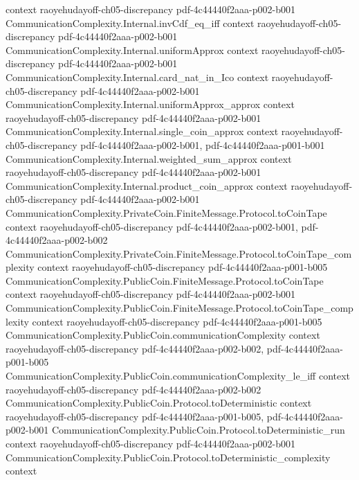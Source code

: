 \begin{theorem}
  {context}
  {raoyehudayoff-ch05-discrepancy}
  {pdf-4c44440f2aaa-p002-b001}
\proofstep
  {CommunicationComplexity.Internal.invCdf_eq_iff}
  {context}
  {raoyehudayoff-ch05-discrepancy}
  {pdf-4c44440f2aaa-p002-b001}
\proofstep
  {CommunicationComplexity.Internal.uniformApprox}
  {context}
  {raoyehudayoff-ch05-discrepancy}
  {pdf-4c44440f2aaa-p002-b001}
\proofstep
  {CommunicationComplexity.Internal.card_nat_in_Ico}
  {context}
  {raoyehudayoff-ch05-discrepancy}
  {pdf-4c44440f2aaa-p002-b001}
\proofstep
  {CommunicationComplexity.Internal.uniformApprox_approx}
  {context}
  {raoyehudayoff-ch05-discrepancy}
  {pdf-4c44440f2aaa-p002-b001}
\proofstep
  {CommunicationComplexity.Internal.single_coin_approx}
  {context}
  {raoyehudayoff-ch05-discrepancy}
  {pdf-4c44440f2aaa-p002-b001,
    pdf-4c44440f2aaa-p001-b001}
\proofstep
  {CommunicationComplexity.Internal.weighted_sum_approx}
  {context}
  {raoyehudayoff-ch05-discrepancy}
  {pdf-4c44440f2aaa-p002-b001}
\proofstep
  {CommunicationComplexity.Internal.product_coin_approx}
  {context}
  {raoyehudayoff-ch05-discrepancy}
  {pdf-4c44440f2aaa-p002-b001}
\proofstep
  {CommunicationComplexity.PrivateCoin.FiniteMessage.Protocol.toCoinTape}
  {context}
  {raoyehudayoff-ch05-discrepancy}
  {pdf-4c44440f2aaa-p002-b001,
    pdf-4c44440f2aaa-p002-b002}
\proofstep
  {CommunicationComplexity.PrivateCoin.FiniteMessage.Protocol.toCoinTape_complexity}
  {context}
  {raoyehudayoff-ch05-discrepancy}
  {pdf-4c44440f2aaa-p001-b005}
\proofstep
  {CommunicationComplexity.PublicCoin.FiniteMessage.Protocol.toCoinTape}
  {context}
  {raoyehudayoff-ch05-discrepancy}
  {pdf-4c44440f2aaa-p002-b001}
\proofstep
  {CommunicationComplexity.PublicCoin.FiniteMessage.Protocol.toCoinTape_complexity}
  {context}
  {raoyehudayoff-ch05-discrepancy}
  {pdf-4c44440f2aaa-p001-b005}
\proofstep
  {CommunicationComplexity.PublicCoin.communicationComplexity}
  {context}
  {raoyehudayoff-ch05-discrepancy}
  {pdf-4c44440f2aaa-p002-b002,
    pdf-4c44440f2aaa-p001-b005}
\proofstep
  {CommunicationComplexity.PublicCoin.communicationComplexity_le_iff}
  {context}
  {raoyehudayoff-ch05-discrepancy}
  {pdf-4c44440f2aaa-p002-b002}
\proofstep
  {CommunicationComplexity.PublicCoin.Protocol.toDeterministic}
  {context}
  {raoyehudayoff-ch05-discrepancy}
  {pdf-4c44440f2aaa-p001-b005,
    pdf-4c44440f2aaa-p002-b001}
\proofstep
  {CommunicationComplexity.PublicCoin.Protocol.toDeterministic_run}
  {context}
  {raoyehudayoff-ch05-discrepancy}
  {pdf-4c44440f2aaa-p002-b001}
\proofstep
  {CommunicationComplexity.PublicCoin.Protocol.toDeterministic_complexity}
  {context}

\end{theorem}
